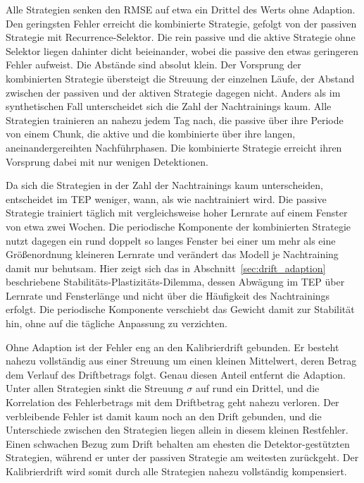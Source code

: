 Alle Strategien senken den \ac{RMSE} auf etwa ein Drittel des Werts ohne Adaption. Den geringsten Fehler erreicht die kombinierte Strategie, gefolgt von der passiven Strategie mit Recurrence-Selektor. Die rein passive und die aktive Strategie ohne  Selektor liegen dahinter dicht beieinander, wobei die passive den etwas geringeren Fehler aufweist. Die Abstände sind absolut klein. Der Vorsprung der kombinierten Strategie übersteigt die Streuung der einzelnen Läufe, der Abstand zwischen der passiven und der aktiven Strategie dagegen nicht. Anders als im synthetischen Fall unterscheidet sich die Zahl der Nachtrainings kaum. Alle Strategien trainieren an nahezu jedem Tag nach, die passive über ihre Periode von einem Chunk, die aktive und die kombinierte über ihre langen, aneinandergereihten Nachführphasen. Die kombinierte Strategie erreicht ihren Vorsprung dabei mit nur wenigen Detektionen. \par
%
Da sich die Strategien in der Zahl der Nachtrainings kaum unterscheiden, entscheidet im \ac{TEP} weniger, wann, als wie nachtrainiert wird. Die passive Strategie trainiert täglich mit vergleichsweise hoher Lernrate auf einem Fenster von etwa zwei Wochen. Die periodische Komponente der kombinierten Strategie nutzt dagegen ein rund doppelt so langes Fenster bei einer um mehr als eine Größenordnung kleineren Lernrate und verändert das Modell je Nachtraining damit nur behutsam. Hier zeigt sich das in Abschnitt~\ref{sec:drift_adaption} beschriebene Stabilitäts-Plastizitäts-Dilemma, dessen Abwägung im \ac{TEP} über Lernrate und Fensterlänge und nicht über die Häufigkeit des Nachtrainings erfolgt. Die periodische Komponente verschiebt das Gewicht damit zur Stabilität hin, ohne auf die tägliche Anpassung zu verzichten. \par
%
Ohne Adaption ist der Fehler eng an den Kalibrierdrift gebunden. Er besteht nahezu vollständig aus einer Streuung um einen kleinen Mittelwert, deren Betrag dem Verlauf des Driftbetrags folgt. Genau diesen Anteil entfernt die Adaption. Unter allen Strategien sinkt die Streuung $\sigma$ auf rund ein Drittel, und die Korrelation des Fehlerbetrags mit dem Driftbetrag geht nahezu verloren. Der verbleibende Fehler ist damit kaum noch an den Drift gebunden, und die Unterschiede zwischen den Strategien liegen allein in diesem kleinen Restfehler. Einen schwachen Bezug zum Drift behalten am ehesten die Detektor-gestützten Strategien, während er unter der passiven Strategie am weitesten zurückgeht. Der Kalibrierdrift wird somit durch alle Strategien nahezu vollständig kompensiert. \par
